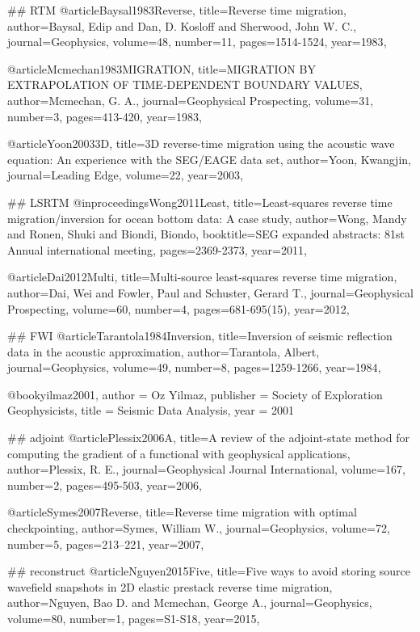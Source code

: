 {## RTM
@article{Baysal1983Reverse,
  title={Reverse time migration},
  author={Baysal, Edip and Dan, D. Kosloff and Sherwood, John W. C.},
  journal={Geophysics},
  volume={48},
  number={11},
  pages={1514-1524},
  year={1983},
}

@article{Mcmechan1983MIGRATION,
  title={MIGRATION BY EXTRAPOLATION OF TIME‐DEPENDENT BOUNDARY VALUES},
  author={Mcmechan, G. A.},
  journal={Geophysical Prospecting},
  volume={31},
  number={3},
  pages={413-420},
  year={1983},
}

@article{Yoon20033D,
  title={3{D} reverse-time migration using the acoustic wave equation: An experience with the SEG/EAGE data set},
  author={Yoon, Kwangjin},
  journal={Leading Edge},
  volume={22},
  year={2003},
}

## LSRTM
@inproceedings{Wong2011Least,
  title={Least‐squares reverse time migration/inversion for ocean bottom data: A case study},
  author={Wong, Mandy and Ronen, Shuki and Biondi, Biondo},
  booktitle={SEG expanded abstracts: 81st Annual international meeting},
  pages={2369-2373},
  year={2011},
}

@article{Dai2012Multi,
  title={Multi-source least-squares reverse time migration},
  author={Dai, Wei and Fowler, Paul and Schuster, Gerard T.},
  journal={Geophysical Prospecting},
  volume={60},
  number={4},
  pages={681-695(15)},
  year={2012},
}

## FWI
@article{Tarantola1984Inversion,
  title={Inversion of seismic reflection data in the acoustic approximation},
  author={Tarantola, Albert},
  journal={Geophysics},
  volume={49},
  number={8},
  pages={1259-1266},
  year={1984},
}

@book{yilmaz2001,
   author = {Oz Yilmaz},
   publisher = {Society of Exploration Geophysicists},
   title = {Seismic Data Analysis},
   year = {2001}
}

## adjoint
@article{Plessix2006A,
  title={A review of the adjoint-state method for computing the gradient of a functional with geophysical applications},
  author={Plessix, R. E.},
  journal={Geophysical Journal International},
  volume={167},
  number={2},
  pages={495-503},
  year={2006},
}

@article{Symes2007Reverse,
  title={Reverse time migration with optimal checkpointing},
  author={Symes, William W.},
  journal={Geophysics},
  volume={72},
  number={5},
  pages={213--221},
  year={2007},
}


## reconstruct
@article{Nguyen2015Five,
  title={Five ways to avoid storing source wavefield snapshots in 2D elastic prestack reverse time migration},
  author={Nguyen, Bao D. and Mcmechan, George A.},
  journal={Geophysics},
  volume={80},
  number={1},
  pages={S1-S18},
  year={2015},
}

}
